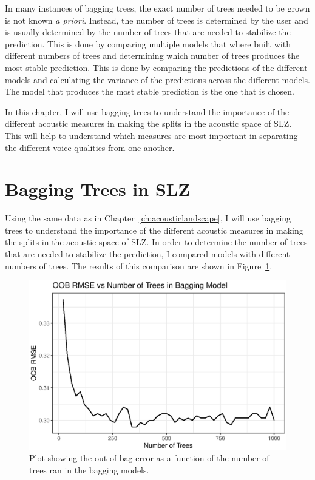 In many instances of bagging trees, the exact number of trees needed to be grown is not known \textit{a priori}. Instead, the number of trees is determined by the user and is usually determined by the number of trees that are needed to stabilize the prediction. This is done by comparing multiple models that where built with different numbers of trees and determining which number of trees produces the most stable prediction. This is done by comparing the predictions of the different models and calculating the variance of the predictions across the different models. The model that produces the most stable prediction is the one that is chosen.

In this chapter, I will use bagging trees to understand the importance of the different acoustic measures in making the splits in the acoustic space of SLZ. This will help to understand which measures are most important in separating the different voice qualities from one another.

\section{Bagging Trees in SLZ} \label{sec:bagging_slz}

Using the same data as in Chapter~\ref{ch:acousticlandscape}, I will use bagging trees to understand the importance of the different acoustic measures in making the splits in the acoustic space of SLZ. In order to determine the number of trees that are needed to stabilize the prediction, I compared models with different numbers of trees. The results of this comparison are shown in Figure~\ref{fig:bagging_tree}.

\begin{figure}[!h]
    \centering
    \includegraphics[width = 0.9\linewidth]{images/bagging_numbers.eps}
    \caption{Plot showing the out-of-bag error as a function of the number of trees ran in the bagging models.}
    \label{fig:bagging_tree}
\end{figure}

